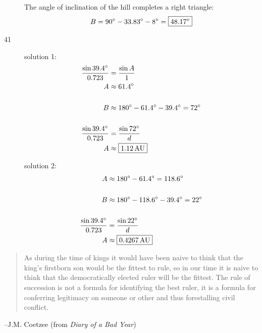 \documentclass{exam}
\newcommand{\dg}{\ensuremath{^\circ}}
\begin{document}
\begin{description}
        The angle of inclination of the hill completes a right triangle:
        \[
          B = 90 \dg - 33.83 \dg - 8 \dg = \boxed{ 48.17 \dg } \\
        \]

      \item[41] 
        solution 1:
        \begin{align*}
          \frac{\sin 39.4 \dg}{0.723} & = \frac{\sin A}{1} \\
          A                           & \approx 61.4 \dg \\
          \\
          B                           & \approx 180 \dg - 61.4 \dg - 39.4 \dg = 72 \dg \\
          \\
          \frac{\sin 39.4 \dg}{0.723} & = \frac{\sin 72 \dg}{d} \\
          A                           & \approx \boxed{ \unit[1.12]{AU} } \\
        \end{align*}

        solution 2:
        \begin{align*}
          A                           & \approx 180 \dg - 61.4 \dg = 118.6 \dg \\
          \\
          B                           & \approx 180 \dg - 118.6 \dg - 39.4 \dg = 22 \dg \\
          \\
          \frac{\sin 39.4 \dg}{0.723} & = \frac{\sin 22 \dg}{d} \\
          A                           & \approx \boxed{ \unit[0.4267]{AU} } \\
        \end{align*}
    \end{description}

  \else
    \vspace{1 cm}
    \begin{quote}
      \begin{em}
        As during the time of kings it would have been naive to think that the king's firstborn son would be the fittest to
        rule, so in our time it is naive to think that the democratically elected ruler will be the fittest. The rule of
        succession is not a formula for identifying the best ruler, it is a formula for conferring legitimacy on someone or
        other and thus forestalling civil conflict.
      \end{em}
    \end{quote}
    \hspace{1.5 cm} --J.M. Coetzee (from {\em Diary of a Bad Year})
  \fi
\end{document}
